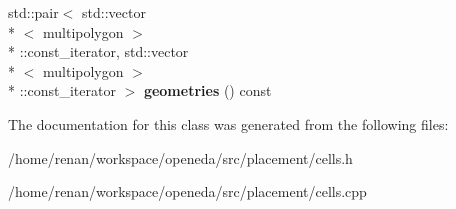 \begin{DoxyCompactItemize}
\item 
\hypertarget{classophidian_1_1placement_1_1cells_af9ddcd87b30ea1061e3c09948c48102d}{std\-::pair$<$ std\-::vector\\*
$<$ multipolygon $>$\\*
\-::const\-\_\-iterator, std\-::vector\\*
$<$ multipolygon $>$\\*
\-::const\-\_\-iterator $>$ {\bfseries geometries} () const }\label{classophidian_1_1placement_1_1cells_af9ddcd87b30ea1061e3c09948c48102d}

\end{DoxyCompactItemize}


The documentation for this class was generated from the following files\-:\begin{DoxyCompactItemize}
\item 
/home/renan/workspace/openeda/src/placement/cells.\-h\item 
/home/renan/workspace/openeda/src/placement/cells.\-cpp\end{DoxyCompactItemize}
